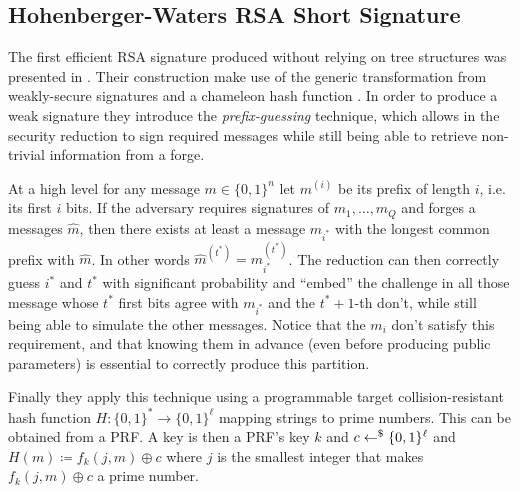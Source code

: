 
\subsection{Hohenberger-Waters RSA Short Signature}
The first efficient RSA signature produced without relying on tree structures was presented in \cite{C:HohWat09}. Their construction make use of the generic transformation from weakly-secure signatures and a chameleon hash function .
In order to produce a weak signature they introduce the \textit{prefix-guessing} technique, which allows in the security reduction to sign required messages while still being able to retrieve non-trivial information from a forge.

At a high level for any message $m \in \{0, 1\}^n$ let $m^{(i)}$ be its prefix of length $i$, i.e. its first $i$ bits. 
If the adversary requires signatures of $m_1, \ldots, m_Q$ and forges a messages $\hat{m}$, then there exists at least a message $m_{i^\ast}$ with the longest common prefix with $\hat{m}$.
In other words $\hat{m}^{(t^\ast)} = m_{i^\ast}^{(t^\ast)}$.
The reduction can then correctly guess $i^\ast$ and $t^\ast$ with significant probability and ``embed'' the challenge in all those message whose $t^\ast$ first bits agree with $m_{i^\ast}$ and the $t^\ast + 1$-th don't, while still being able to simulate the other messages.
Notice that the $m_i$ don't satisfy this requirement, and that knowing them in advance (even before producing public parameters) is essential to correctly produce this partition.

Finally they apply this technique using a programmable target collision-resistant hash function $H : \{0, 1\}^\ast \to \{0, 1\}^\ell$ mapping strings to prime numbers.
This can be obtained from a PRF. 
A key is then a PRF's key $k$ and $c \gets^{\$} \{0, 1\}^\ell$ and $H(m) \coloneqq f_k(j, m) \oplus c$ where $j$ is the smallest integer that makes $f_k(j, m) \oplus c$ a prime number.


